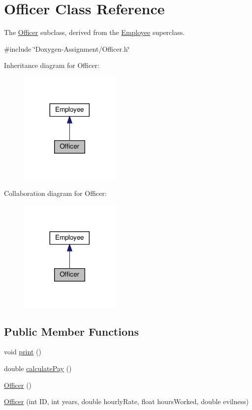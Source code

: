 \hypertarget{classOfficer}{}\section{Officer Class Reference}
\label{classOfficer}


The \hyperlink{classOfficer}{Officer} subclass, derived from the \hyperlink{classEmployee}{Employee} superclass.  




{\ttfamily \#include \char`\"{}Doxygen-\/\+Assignment/\+Officer.\+h\char`\"{}}



Inheritance diagram for Officer\+:\nopagebreak
\begin{figure}[H]
\begin{center}
\leavevmode
\includegraphics[width=140pt]{classOfficer__inherit__graph}
\end{center}
\end{figure}


Collaboration diagram for Officer\+:\nopagebreak
\begin{figure}[H]
\begin{center}
\leavevmode
\includegraphics[width=140pt]{classOfficer__coll__graph}
\end{center}
\end{figure}
\subsection*{Public Member Functions}
\begin{DoxyCompactItemize}
\item 
void \hyperlink{classOfficer_aeadece05a1a0b7fb29bd412830d2e07a}{print} ()
\item 
double \hyperlink{classOfficer_a1fa1aad39b9e95be7a088990ebf17059}{calculate\+Pay} ()
\item 
\hyperlink{classOfficer_a80ac1e36a3f36c3a7e12b5dc9320ad89}{Officer} ()
\item 
\hyperlink{classOfficer_ac75c45d6e8628606278cb4ce6596f67f}{Officer} (int ID, int years, double hourly\+Rate, float hours\+Worked, double evilness)
\end{DoxyCompactItemize}
